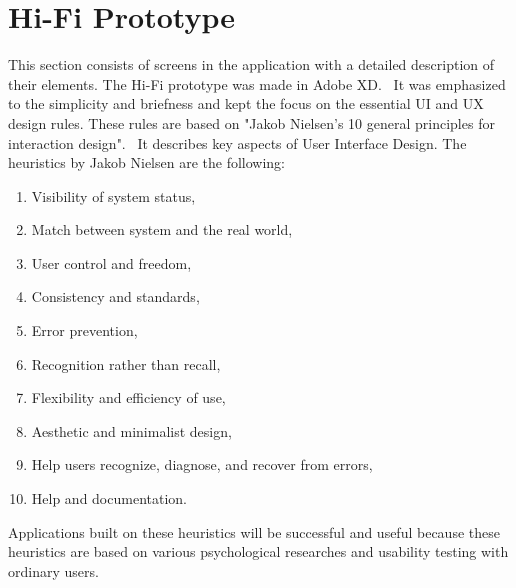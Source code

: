 \section{Hi-Fi Prototype}\label{sec:hi-fi-prototype}
This section consists of screens in the application with a detailed description of their elements.
The Hi-Fi prototype was made in Adobe XD.~\cite{adobeXD}
It was emphasized to the simplicity and briefness and kept the focus on the essential UI and UX design rules.
These rules are based on "Jakob Nielsen's 10 general principles for interaction design".~\cite{nnGroup}
It describes key aspects of User Interface Design.
The heuristics by Jakob Nielsen are the following:
\begin{enumerate}
    \item Visibility of system status,
    \item Match between system and the real world,
    \item User control and freedom,
    \item Consistency and standards,
    \item Error prevention,
    \item Recognition rather than recall,
    \item Flexibility and efficiency of use,
    \item Aesthetic and minimalist design,
    \item Help users recognize, diagnose, and recover from errors,
    \item Help and documentation.
\end{enumerate}

Applications built on these heuristics will be successful and useful because these heuristics are based on various psychological researches and usability testing with ordinary users.














